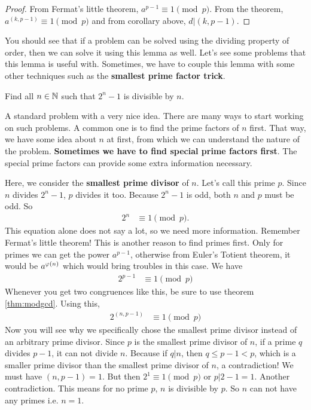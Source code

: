 \documentclass{subfile}
\begin{document}
		\begin{proof}
			From Fermat's little theorem, $a^{p-1}\equiv1\pmod p$. From the theorem, $a^{(k,p-1)}\equiv1\pmod p$ and from corollary above, $d|(k,p-1)$.
		\end{proof}
	You should see that if a problem can be solved using the dividing property of order, then we can solve it using this lemma as well. Let's see some problems that this lemma is useful with. Sometimes, we have to couple this lemma with some other techniques such as the \textbf{smallest prime factor trick}.
	
	\begin{problem}
		Find all $n\in\mathbb{N}$ such that $2^n-1$ is divisible by $n$.
	\end{problem}
	A standard problem with a very nice idea. There are many ways to start working on such problems. A common one is to find the prime factors of $n$ first. That way, we have some idea about $n$ at first, from which we can understand the nature of the problem. \textbf{Sometimes we have to find special prime factors first}. The special prime factors can provide some extra information necessary.
	\begin{solution}
		Here, we consider the \textbf{smallest prime divisor} of $n$. Let's call this prime $p$. Since $n$ divides $2^n-1$, $p$ divides it too. Because $2^n-1$ is odd, both $n$ and $p$ must be odd. So
		\begin{align*}
			2^n & \equiv1\pmod p.
		\end{align*}
		This equation alone does not say a lot, so we need more information. Remember Fermat's little theorem! This is another reason to find primes first. Only for primes we can get the power $a^{p-1}$, otherwise from Euler's Totient theorem, it would be $a^{\varphi(n)}$ which would bring troubles in this case. We have
		\begin{align*}
			2^{p-1} & \equiv1\pmod p
		\end{align*}
		Whenever you get two congruences like this, be sure to use theorem \eqref{thm:modgcd}. Using this,
		\begin{align*}
			2^{(n,p-1)} & \equiv1\pmod p
		\end{align*}
		Now you will see why we specifically chose the smallest prime divisor instead of an arbitrary prime divisor. Since $p$ is the smallest prime divisor of $n$, if a prime $q$ divides $p-1$, it can not divide $n$. Because if $q|n$, then $q\leq p-1<p$, which is a smaller prime divisor than the smallest prime divisor of $n$, a contradiction! We must have $(n,p-1)=1$. But then $2^1\equiv1\pmod p$ or $p|2-1=1$. Another contradiction. This means for no prime $p$, $n$ is divisible by $p$. So $n$ can  not have any primes i.e. $n=1$.
	\end{solution}
	
\end{document}

